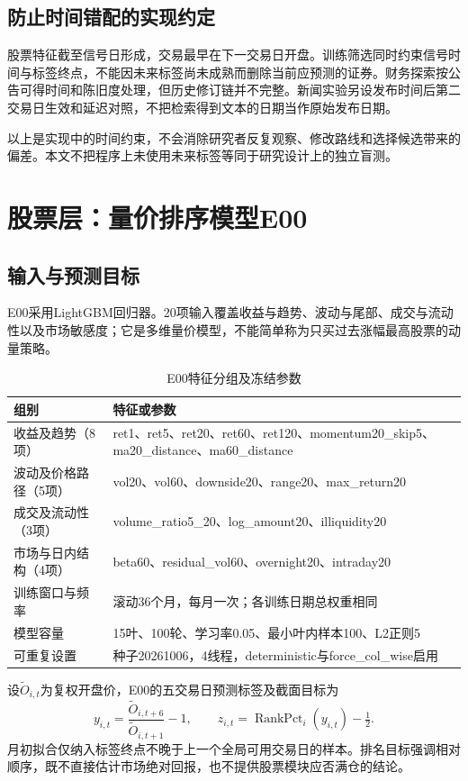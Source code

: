 \documentclass[11pt,a4paper]{article}
\begin{document}
\subsection{防止时间错配的实现约定}
股票特征截至信号日形成，交易最早在下一交易日开盘。训练筛选同时约束信号时间与标签终点，不能因未来标签尚未成熟而删除当前应预测的证券。财务探索按公告可得时间和陈旧度处理，但历史修订链并不完整。新闻实验另设发布时间后第二交易日生效和延迟对照，不把检索得到文本的日期当作原始发布日期。

以上是实现中的时间约束，不会消除研究者反复观察、修改路线和选择候选带来的偏差。本文不把程序上未使用未来标签等同于研究设计上的独立盲测。

\clearpage
\section{股票层：量价排序模型E00}
\subsection{输入与预测目标}
E00采用LightGBM回归器\cite{lgb}。20项输入覆盖收益与趋势、波动与尾部、成交与流动性以及市场敏感度；它是多维量价模型，不能简单称为只买过去涨幅最高股票的动量策略。

\begin{table}[htbp]\centering\small
\caption{E00特征分组及冻结参数}\label{tab:features}
\begin{tabular}{@{}p{3.0cm}p{11.3cm}@{}}\toprule
组别 & 特征或参数 \\\midrule
收益及趋势（8项） & ret1、ret5、ret20、ret60、ret120、momentum20\_skip5、ma20\_distance、ma60\_distance \\
波动及价格路径（5项） & vol20、vol60、downside20、range20、max\_return20 \\
成交及流动性（3项） & volume\_ratio5\_20、log\_amount20、illiquidity20 \\
市场与日内结构（4项） & beta60、residual\_vol60、overnight20、intraday20 \\\midrule
训练窗口与频率 & 滚动36个月，每月一次；各训练日期总权重相同 \\
模型容量 & 15叶、100轮、学习率0.05、最小叶内样本100、L2正则5 \\
可重复设置 & 种子20261006，4线程，deterministic与force\_col\_wise启用 \\
\bottomrule\end{tabular}\end{table}

设$\widetilde O_{i,t}$为复权开盘价，E00的五交易日预测标签及截面目标为
\begin{equation}
 y_{i,t}=\frac{\widetilde O_{i,t+6}}{\widetilde O_{i,t+1}}-1,\qquad
 z_{i,t}=\operatorname{RankPct}_{i}(y_{i,t})-\tfrac12.
\end{equation}
月初拟合仅纳入标签终点不晚于上一个全局可用交易日的样本。排名目标强调相对顺序，既不直接估计市场绝对回报，也不提供股票模块应否满仓的结论。
\end{document}
